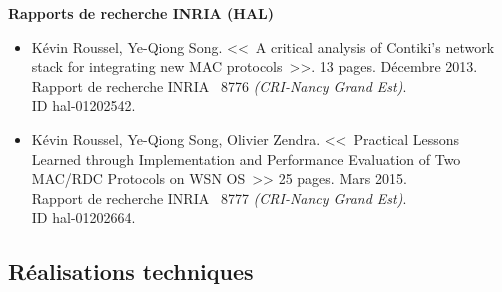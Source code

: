 \documentclass[10pt,c]{beamer}
\begin{document}
\begin{frame}[label=publis]
\textbf{Rapports de recherche INRIA (HAL)}
\begin{itemize}
\item Kévin Roussel, Ye-Qiong Song.
<<~A critical analysis of Contiki's network stack for integrating
new MAC protocols~>>. 13 pages. Décembre 2013.\\
Rapport de recherche INRIA \no~8776 \textit{(CRI-Nancy Grand Est)}.\\
ID hal-01202542.
\item Kévin Roussel, Ye-Qiong Song, Olivier Zendra.
<<~Practical Lessons Learned through Implementation and Performance
Evaluation of Two MAC/RDC Protocols on WSN OS~>> 25 pages. Mars 2015.\\
Rapport de recherche INRIA \no~8777 \textit{(CRI-Nancy Grand Est)}.\\
ID hal-01202664.
\end{itemize}

\end{frame}


\subsection{Réalisations techniques}
\end{document}
